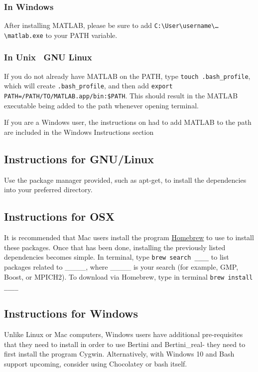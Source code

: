 \subsubsection*{In Windows}

After installing MATLAB, please be sure to add \texttt{C:\textbackslash{User}\textbackslash{username}\textbackslash{\ldots}\textbackslash{matlab.exe}} to your PATH variable. 


\subsubsection*{In Unix \ GNU Linux}

If you do not already have MATLAB on the PATH, type \texttt{touch .bash\_profile}, which will create \texttt{.bash\_profile}, and then add \texttt{export PATH=/PATH/TO/MATLAB.app/bin:\$PATH}. This should result in the MATLAB executable being added to the path whenever opening terminal. 

If you are a Windows user, the instructions on had to add MATLAB to the \gls{path} are included in the Windows Instructions section


	\subsection{Instructions for GNU/Linux}

Use the package manager provided, such as apt-get, to install the dependencies into your preferred directory.

	\subsection{Instructions for OSX}

It is recommended that Mac users install the program \href{http://brew.sh}{Homebrew} to use to install these packages. Once that has been done, installing the previously listed dependencies becomes simple. In terminal,  type \texttt{brew search \_\_\_\_} to list packages related to \_\_\_\_, where \_\_\_\_ is your search (for example, GMP, Boost, or MPICH2). To download via Homebrew, type in terminal \texttt{brew install \_\_\_\_}
	




	\subsection{Instructions for Windows}
Unlike Linux or Mac computers, Windows users have additional pre-requisites that they need to install in order to use Bertini and Bertini\_real- they need to first install the program Cygwin.  Alternatively, with Windows 10 and Bash support upcoming, consider using Chocolatey or bash itself.

